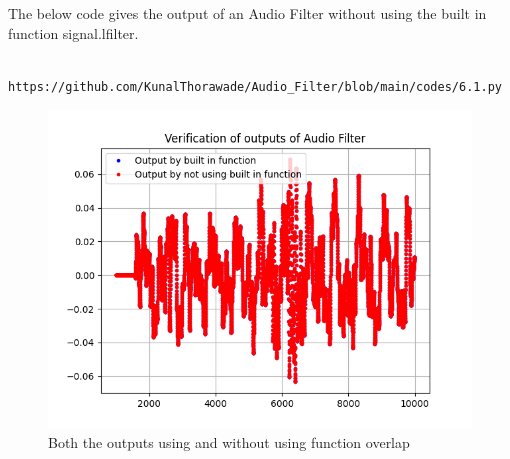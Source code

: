 \documentclass[journal,12pt,twocolumn]{IEEEtran}
\theoremstyle{remark}
\begin{document}
\begin{enumerate}[label=\thesection.\arabic*]
																																																																																			 \solution The below code gives the output of an Audio Filter without using the built in function signal.lfilter.
																																																																																			 \begin{lstlisting}
																																																																																			 https://github.com/KunalThorawade/Audio_Filter/blob/main/codes/6.1.py
																																																																																			 \end{lstlisting}
																																																																																			 \begin{figure}[H]
																																																																																			 \centering
																																																																																			 \includegraphics[width=\columnwidth]{figs/Audio_Filter_verf.png}
																																																																																			 \caption{Both the outputs using and without using function overlap}
																																																																																			 \label{fig:6.1}
																																																																																			 \end{figure}






\end{enumerate}
\end{document}
